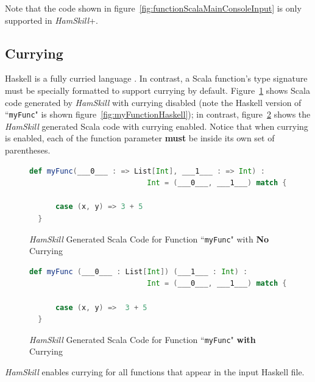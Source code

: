 \documentclass{report}
\begin{document}
Note that the code shown in figure~\ref{fig:functionScalaMainConsoleInput} is only supported in \textit{HamSkill}+.

\subsection{Currying}\label{sec:currying}

Haskell is a fully curried language \cite{learnYouAHaskell}.  In contrast, a Scala function's type signature must be specially formatted to support currying by default. Figure~\ref{fig:myFuncInScalaNoCurrying} shows Scala code generated by \textit{HamSkill} with currying disabled (note the Haskell version of ``\texttt{myFunc}" is shown figure~\ref{fig:myFunctionHaskell}); in contrast, figure~\ref{fig:myFuncInScalaWithCurrying} shows the \textit{HamSkill} generated Scala code with currying enabled.  Notice that when currying is enabled, each of the function parameter \textbf{must} be inside its own set of parentheses.

\begin{figure}[H]
\begin{mdframed}
\begin{lstlisting}[basicstyle=\small, language=scala]
  def myFunc(___0___ : => List[Int], ___1___ : => Int) : 
                           Int = (___0___, ___1___) match {
      
      case (x, y) => 3 + 5
  } 
\end{lstlisting}
\end{mdframed}
\caption{\textit{HamSkill} Generated Scala Code for Function ``\texttt{myFunc}" with \textbf{No} Currying}\label{fig:myFuncInScalaNoCurrying}
\end{figure}

\begin{figure}[H]
\begin{mdframed}
\begin{lstlisting}[basicstyle=\small, language=scala]
  def myFunc (___0___ : List[Int]) (___1___ : Int) :  
                           Int = (___0___, ___1___) match {
      
      case (x, y) =>  3 + 5
  }
\end{lstlisting}
\end{mdframed}
\caption{\textit{HamSkill} Generated Scala Code for Function ``\texttt{myFunc}" \textbf{with} Currying}\label{fig:myFuncInScalaWithCurrying}
\end{figure}

\textit{HamSkill} enables currying for all functions that appear in the input Haskell file.
\end{document}
